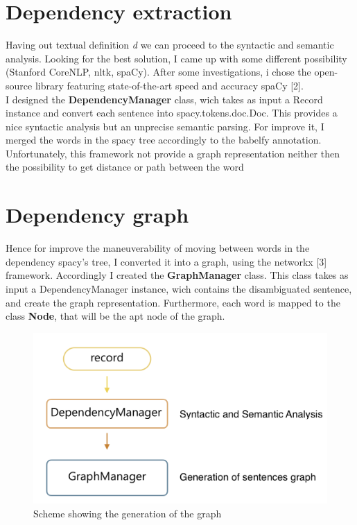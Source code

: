 \documentclass[conference,compsoc]{IEEEtran}
\begin{document}
\section{Dependency extraction}
Having out textual definition \textit{d} we can proceed to the syntactic and semantic analysis.  Looking for the best solution, I came up with some different possibility (Stanford CoreNLP, nltk, spaCy). After some investigations, i chose the open-source library featuring state-of-the-art speed and accuracy spaCy [2].\\
I designed the \textbf{DependencyManager} class, wich takes as input a Record instance and convert each sentence into spacy.tokens.doc.Doc. This provides a nice syntactic analysis but an unprecise semantic parsing. 
For improve it, I merged the words in the spacy tree accordingly to the babelfy annotation. Unfortunately, this framework not provide a graph representation neither then the possibility to get distance or path between the word

 
\section{Dependency graph}
Hence for improve the maneuverability of moving between words in the dependency spacy's tree, I converted it into a graph, using the networkx [3] framework. Accordingly I created the \textbf{GraphManager} class. This class takes as input a DependencyManager instance, wich contains the disambiguated sentence, and create the graph representation. Furthermore, each word is mapped to the class \textbf{Node}, that will be the apt node of the graph. 

\begin{figure}[h]
\centering
\includegraphics[scale=0.30]{graphmanager2}
\caption{ Scheme showing the generation of the graph }
\end{figure}
\end{document}
